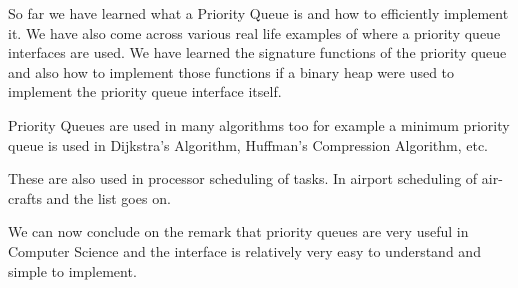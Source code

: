 So far we have learned what a Priority Queue is and how to efficiently implement it.
We have also come across various real life examples of where a priority queue interfaces are used.
We have learned the signature functions of the priority queue and also how to implement those functions if a binary heap were used to implement the priority queue interface itself.


Priority Queues are used in many algorithms too for example a minimum priority queue is used in Dijkstra's Algorithm, Huffman's Compression Algorithm, etc.

These are also used in processor scheduling of tasks. In airport scheduling of air-crafts and the list goes on.

We can now conclude on the remark that priority queues are very useful in Computer Science and the interface is relatively very easy to understand and simple to
implement.